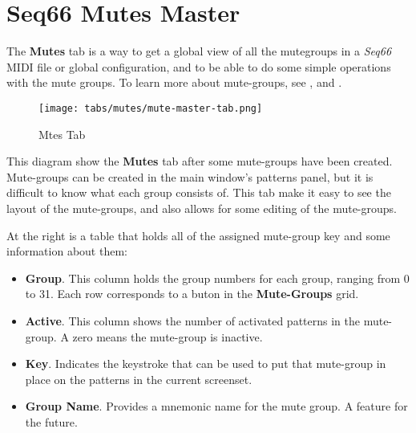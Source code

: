 %
%
%

\section{Seq66 Mutes Master}
\label{sec:mutes}

   The \textbf{Mutes} tab is a way to get a global view of all the mutegroups in
   a \textsl{Seq66} MIDI file or global configuration, and to be able to do
   some simple operations with the mute groups.
   To learn more about mute-groups, see
   , and
   .

\begin{figure}[H]
   \centering 
   \texttt{[image: tabs/mutes/mute-master-tab.png]}
   \caption{Mtes Tab}
   \label{fig:mutes_master_tab}
\end{figure}

   This diagram show the \textbf{Mutes} tab after some mute-groups have been
   created.  Mute-groups can be created in the main window's patterns panel, but
   it is difficult to know what each group consists of.  This tab make it easy to
   see the layout of the mute-groups, and also allows for some editing of the
   mute-groups.

   \setcounter{ItemCounter}{0}      %

   At the right is a table that holds all of the assigned mute-group key and some
   information about them:

      \begin{itemize}
         \item \textbf{Group}.
            This column holds the group numbers for each group, ranging from 0 to
            31.  Each row corresponds to a buton in the \textbf{Mute-Groups} grid.
         \item \textbf{Active}.
            This column shows the number of activated patterns in the mute-group.
            A zero means the mute-group is inactive.
         \item \textbf{Key}.
            Indicates the keystroke that can be used to put that mute-group in
            place on the patterns in the current screenset.
         \item \textbf{Group Name}.
            Provides a mnemonic name for the mute group.  A feature for the
            future.
      \end{itemize}

